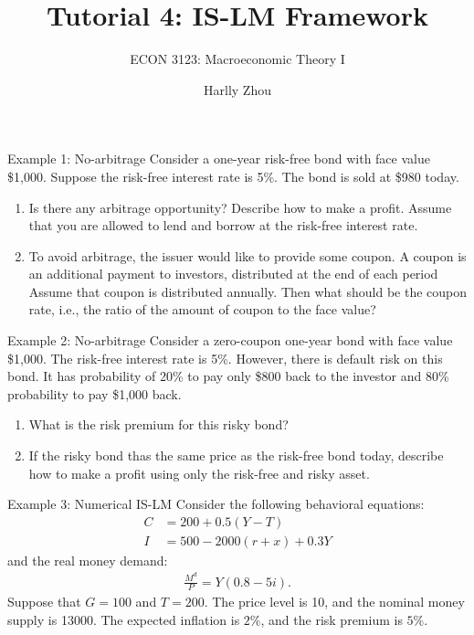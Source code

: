 \documentclass[xcolor=dvipsnames]{beamer}
\title[Measurment of Macroeconomy]{Tutorial 4: IS-LM Framework}
\subtitle{ECON 3123: Macroeconomic Theory I}
\author[Harlly Zhou]{Harlly Zhou}
\institute[HKUST]{Department of Economics\\
HKUST Business School}
\date{}
\begin{document}
\begin{frame}
\titlepage
\end{frame}

\begin{frame}{Example 1: No-arbitrage}
    Consider a one-year risk-free bond with face value \$1,000. Suppose the risk-free interest rate is 5\%. The bond is sold at \$980 today.
    \begin{enumerate}
        \item Is there any arbitrage opportunity? Describe how to make a profit. Assume that you are allowed to lend and borrow at the risk-free interest rate.
        \item To avoid arbitrage, the issuer would like to provide some coupon. A coupon is an additional payment to investors, distributed at the end of each period Assume that coupon is distributed annually. Then what should be the coupon rate, i.e., the ratio of the amount of coupon to the face value?
    \end{enumerate}
\end{frame}

\begin{frame}{Example 2: No-arbitrage}
    Consider a zero-coupon one-year bond with face value \$1,000. The risk-free interest rate is 5\%. However, there is default risk on this bond. It has probability of 20\% to pay only \$800 back to the investor and 80\% probability to pay \$1,000 back. 
    \begin{enumerate}
        \item What is the risk premium for this risky bond?
        \item If the risky bond thas the same price as the risk-free bond today, describe how to make a profit using only the risk-free and risky asset.
    \end{enumerate}
\end{frame}

\begin{frame}{Example 3: Numerical IS-LM}
    Consider the following behavioral equations:
    \begin{align*}
        C &= 200 + 0.5(Y-T)\\
        I &= 500 - 2000(r+x) + 0.3Y
    \end{align*}
    and the real money demand:
    \begin{align*}
        \frac{M^d}{P} = Y(0.8-5i).
    \end{align*}
    Suppose that $G = 100$ and $T = 200$. The price level is 10, and the nominal money supply is 13000. The expected inflation is $2\%$, and the risk premium is $5\%$.
\end{frame}
\end{document}
